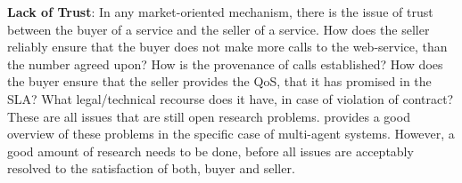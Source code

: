 \documentclass[10pt,journal,compsoc]{IEEEtran}
\begin{document}
\textbf{Lack of Trust}: In any market-oriented mechanism, there is the issue of trust between the buyer of a service and the seller of a service. How does the seller reliably ensure that the buyer does not make more calls to the web-service, than the number agreed upon? How is the provenance of calls established? How does the buyer ensure that the seller provides the QoS, that it has promised in the SLA? What legal/technical recourse does it have, in case of violation of contract? These are all issues that are still open research problems. \cite{Ramchurn2005Trust} provides a good overview of these problems in the specific case of multi-agent systems. However, a good amount of research needs to be done, before all issues are acceptably resolved to the satisfaction of both, buyer and seller.\\
%
\end{document}
